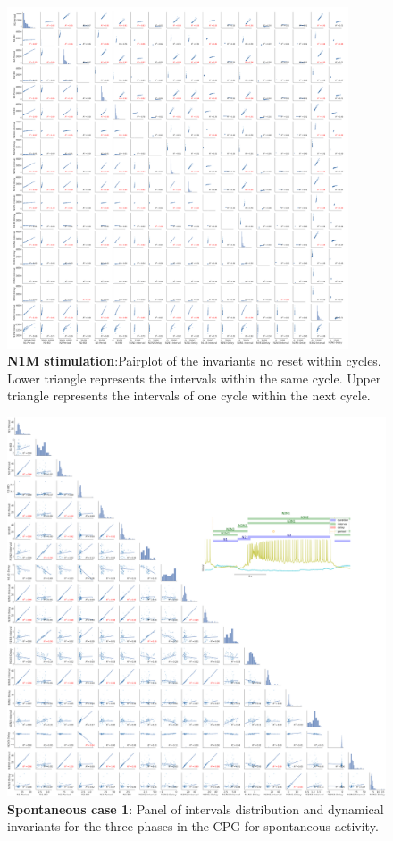 \begin{figure}[htbp]
	\centering
	\includegraphics[width=0.9\textwidth]{./invariants/data/MODEL/n1m_driven/images/3phases/_output_pairplot_reset.png}
	\caption{\textbf{N1M stimulation}:Pairplot of the invariants no reset within cycles. Lower triangle represents the intervals within the same cycle. Upper triangle represents the intervals of one cycle within the next cycle. }
	\label{fig:N1M stimulation pairplot reset}
\end{figure}

\begin{figure}[htbp]
	\centering
	\includegraphics[width=\textwidth]{./img/invariants/data/SUSSEX/prep2/images/3phases/panel_with_pairplot.png}
	\caption{\textbf{Spontaneous case 1}: Panel of intervals distribution and dynamical invariants for the three phases in the CPG for spontaneous activity.}
	\label{fig:prep2 pairplot invariants}
\end{figure}



